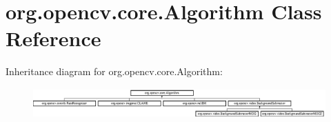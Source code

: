 \hypertarget{classorg_1_1opencv_1_1core_1_1_algorithm}{}\section{org.\+opencv.\+core.\+Algorithm Class Reference}
\label{classorg_1_1opencv_1_1core_1_1_algorithm}
Inheritance diagram for org.\+opencv.\+core.\+Algorithm\+:\begin{figure}[H]
\begin{center}
\leavevmode
\includegraphics[height=1.166667cm]{classorg_1_1opencv_1_1core_1_1_algorithm}
\end{center}
\end{figure}
